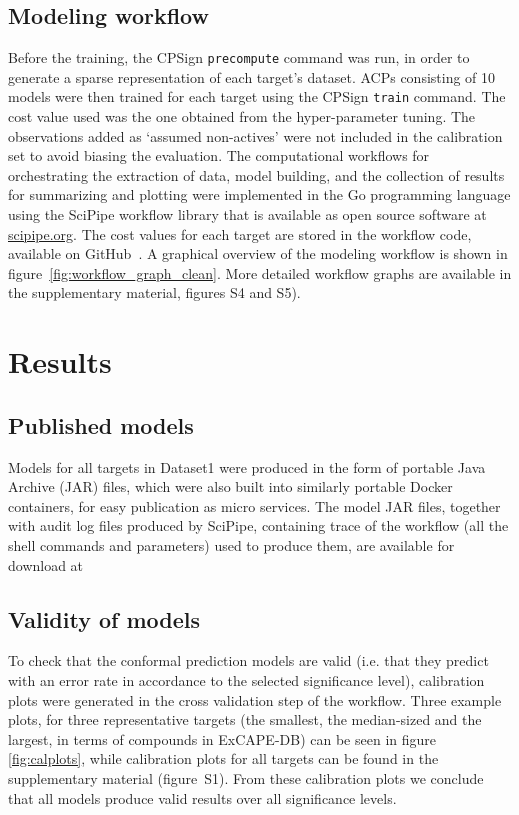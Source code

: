 \documentclass[utf8]{frontiersSCNS} %
\begin{document}
\subsection{Modeling workflow}
Before the training, the CPSign \texttt{precompute} command was run, in order
to generate a sparse representation of each target's dataset.  ACPs consisting
of 10 models were then trained for each target using the CPSign \texttt{train}
command. The cost value used was the one obtained from the hyper-parameter
tuning. The observations added as `assumed non-actives' were not included in
the calibration set to avoid biasing the evaluation.
The computational workflows for orchestrating the extraction of data, model
building, and the collection of results for summarizing and plotting were
implemented in the Go programming language using the SciPipe workflow library
that is available as open source software at
\href{http://scipipe.org}{scipipe.org}.  The cost values for each target are
stored in the workflow code, available on GitHub~\cite{PTPGitHub}.
A graphical overview of the modeling workflow is shown in
figure~\ref{fig:workflow_graph_clean}. More detailed workflow graphs are
available in the supplementary material, figures S4 and S5).


\section{Results} \label{Results}

\subsection{Published models}
Models for all targets in Dataset1 were produced in the form of portable Java
Archive (JAR) files, which were also built into similarly portable Docker
containers, for easy publication as micro services.  The model JAR files,
together with audit log files produced by SciPipe, containing trace of the
workflow (all the shell commands and parameters) used to produce them, are
available for download at~\cite{ModelsZenodo}

\subsection{Validity of models}
To check that the conformal prediction models are valid (i.e. that they predict with
an error rate in accordance to the selected significance level), calibration plots
were generated in the cross validation step of the workflow. Three example
plots, for three representative targets (the smallest, the median-sized and the
largest, in terms of compounds in ExCAPE-DB) can be seen in figure
\ref{fig:calplots}, while calibration plots for all targets can be
found in the supplementary material (figure~S1).
From these calibration plots we conclude that all models produce valid results over all
significance levels.
\end{document}
